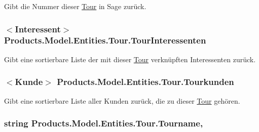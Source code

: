 Gibt die Nummer dieser \hyperlink{class_products_1_1_model_1_1_entities_1_1_tour}{Tour} in Sage zurück. 

\subsubsection[{\texorpdfstring{Tour\+Interessenten}{TourInteressenten}}]{$<${\bf Interessent}$>$ Products.\+Model.\+Entities.\+Tour.\+Tour\+Interessenten\hspace{0.3cm}{\ttfamily [get]}}\hypertarget{class_products_1_1_model_1_1_entities_1_1_tour_a56407115fe446d2805c2b2ecafae38d6}{}\label{class_products_1_1_model_1_1_entities_1_1_tour_a56407115fe446d2805c2b2ecafae38d6}


Gibt eine sortierbare Liste der mit dieser \hyperlink{class_products_1_1_model_1_1_entities_1_1_tour}{Tour} verknüpften Interessenten zurück. 

\subsubsection[{\texorpdfstring{Tourkunden}{Tourkunden}}]{$<${\bf Kunde}$>$ Products.\+Model.\+Entities.\+Tour.\+Tourkunden\hspace{0.3cm}{\ttfamily [get]}}\hypertarget{class_products_1_1_model_1_1_entities_1_1_tour_a1c3268a7a8319fbb9d7c22e29166dd85}{}\label{class_products_1_1_model_1_1_entities_1_1_tour_a1c3268a7a8319fbb9d7c22e29166dd85}


Gibt eine sortierbare Liste aller Kunden zurück, die zu dieser \hyperlink{class_products_1_1_model_1_1_entities_1_1_tour}{Tour} gehören. 

\subsubsection[{\texorpdfstring{Tourname}{Tourname}}]{\setlength{\rightskip}{0pt plus 5cm}string Products.\+Model.\+Entities.\+Tour.\+Tourname\hspace{0.3cm}{\ttfamily [get]}, {\ttfamily [set]}}\hypertarget{class_products_1_1_model_1_1_entities_1_1_tour_a6ebcf3f9df624c625c380a813239be79}{}\label{class_products_1_1_model_1_1_entities_1_1_tour_a6ebcf3f9df624c625c380a813239be79}


